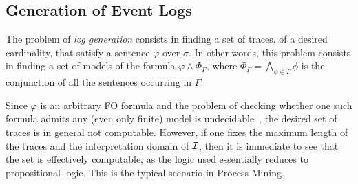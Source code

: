 \subsection{Generation of Event Logs}
The problem of \emph{log generation} consists in finding a set of traces,
of a desired cardinality, that satisfy a sentence $\varphi$ over $\sigma$.
In other words, this problem consists in finding a set of models of the formula
$\varphi\land\Phi_\Gamma$, where $\Phi_\Gamma=\bigwedge_{\phi\in\Gamma}\phi$
is the conjunction of all the sentences occurring in $\Gamma$.

Since $\varphi$ is an arbitrary FO formula and the problem of checking whether
one such formula admits any (even only finite) model is undecidable~\cite{libkin-book},
the desired set of traces is in general not computable. However, if one fixes
the maximum length of the traces and the interpretation domain of $\mathcal{I}$,
then it is immediate to see that the set is effectively computable, as the
logic used essentially reduces to propositional logic.
This is the typical scenario in Process Mining.

